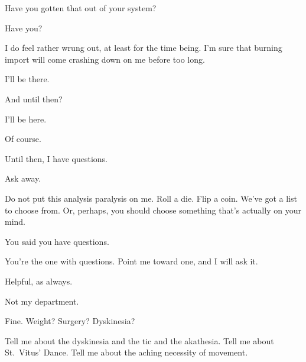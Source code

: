 Have you gotten that out of your system?

\begin{ally}
Have you?
\end{ally}
I do feel rather wrung out, at least for the time being. I'm sure that burning import will come crashing down on me before too long.

\begin{ally}
I'll be there.
\end{ally}
And until then?

\begin{ally}
I'll be here.
\end{ally}
Of course.

\begin{ally}
Until then, I have questions.
\end{ally}
Ask away.

\begin{ally}
Do not put this analysis paralysis on me. Roll a die. Flip a coin. We've got a list to choose from. Or, perhaps, you should choose something that's actually on your mind.
\end{ally}
You said you have questions.

\begin{ally}
You're the one with questions. Point me toward one, and I will ask it.
\end{ally}
Helpful, as always.

\begin{ally}
Not my department.
\end{ally}
Fine. Weight? Surgery? Dyskinesia?

\begin{ally}
Tell me about the dyskinesia and the tic and the akathesia. Tell me about St.~Vitus' Dance. Tell me about the aching necessity of movement.
\end{ally}
\newpage
